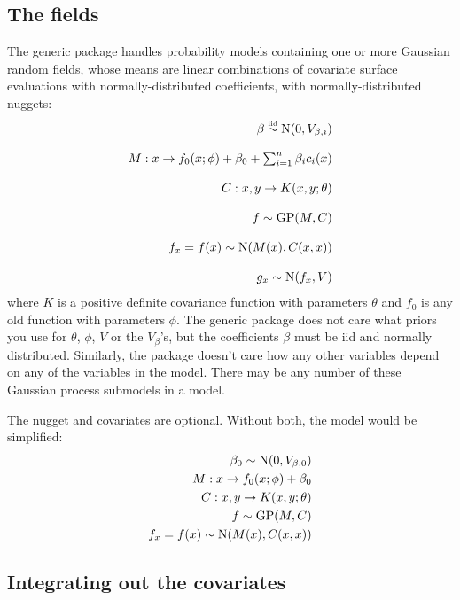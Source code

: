 \subsection{The fields}

The generic package handles probability models containing one or more Gaussian random fields, whose means are linear combinations of covariate surface evaluations with normally-distributed coefficients, with normally-distributed nuggets:
\begin{equation}
    \label{eq:canonical} 
    \begin{array}{r}
        \beta \stackrel{\textup{\tiny iid}}{\sim} \textup{N}(0,V_{\beta,i}) \\\\
        M:x\rightarrow f_0(x;\phi) + \beta_0 + \sum_{i=1}^n \beta_i c_i(x)\\\\
        C:x,y\rightarrow K(x,y;\theta)\\\\
        f \sim \textup{GP}(M,C)\\\\
        f_x = f(x) \sim \textup{N}(M(x), C(x,x))\\\\
        g_x \sim \textup{N}(f_x, V) 
    \end{array}
\end{equation}
where $K$ is a positive definite covariance function with parameters $\theta$ and $f_0$ is any old function with parameters $\phi$. The generic package does not care what priors you use for $\theta$, $\phi$, $V$ or the $V_\beta$'s, but the coefficients $\beta$ must be iid and normally distributed. Similarly, the package doesn't care how any other variables depend on any of the variables in the model. There may be any number of these Gaussian process submodels in a model.

The nugget and covariates are optional. Without both, the model would be simplified:
\begin{eqnarray*}
    \beta_0\sim\textup{N}(0,V_{\beta,0})\\
    M:x\rightarrow f_0(x;\phi) + \beta_0\\
    C:x,y\rightarrow K(x,y;\theta)\\
    f \sim \textup{GP}(M,C)\\
    f_x = f(x) \sim \textup{N}(M(x), C(x,x))
\end{eqnarray*}

\subsection{Integrating out the covariates}

